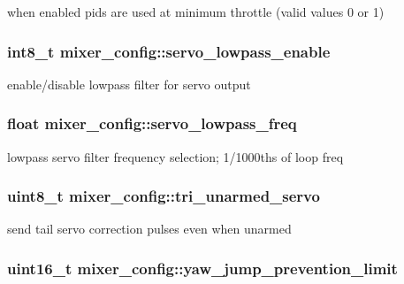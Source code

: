 when enabled pids are used at minimum throttle (valid values 0 or 1) 

\hypertarget{structmixer__config_a52ddd8fd52d3ec5b796b335cb8a42f6e}{
\subsubsection[{servo\+\_\+lowpass\+\_\+enable}]{\setlength{\rightskip}{0pt plus 5cm}int8\+\_\+t mixer\+\_\+config\+::servo\+\_\+lowpass\+\_\+enable}}\label{structmixer__config_a52ddd8fd52d3ec5b796b335cb8a42f6e}


enable/disable lowpass filter for servo output 

\hypertarget{structmixer__config_acadf394b2a40a9e17ea114bc3f6bef59}{
\subsubsection[{servo\+\_\+lowpass\+\_\+freq}]{\setlength{\rightskip}{0pt plus 5cm}float mixer\+\_\+config\+::servo\+\_\+lowpass\+\_\+freq}}\label{structmixer__config_acadf394b2a40a9e17ea114bc3f6bef59}


lowpass servo filter frequency selection; 1/1000ths of loop freq 

\hypertarget{structmixer__config_af445bdb2c8e719752f254c017d8c9817}{
\subsubsection[{tri\+\_\+unarmed\+\_\+servo}]{\setlength{\rightskip}{0pt plus 5cm}uint8\+\_\+t mixer\+\_\+config\+::tri\+\_\+unarmed\+\_\+servo}}\label{structmixer__config_af445bdb2c8e719752f254c017d8c9817}


send tail servo correction pulses even when unarmed 

\hypertarget{structmixer__config_a81d695b85aa12bb0f7b5d806c5fe2bd6}{
\subsubsection[{yaw\+\_\+jump\+\_\+prevention\+\_\+limit}]{\setlength{\rightskip}{0pt plus 5cm}uint16\+\_\+t mixer\+\_\+config\+::yaw\+\_\+jump\+\_\+prevention\+\_\+limit}}\label{structmixer__config_a81d695b85aa12bb0f7b5d806c5fe2bd6}


